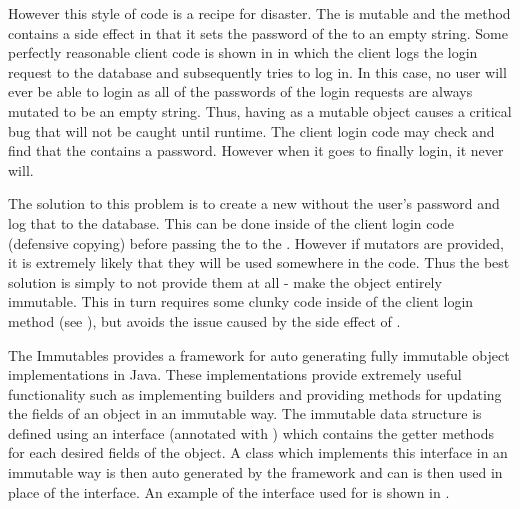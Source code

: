 



However this style of code is a recipe for disaster. The  is mutable and the  method contains a side effect in that it sets the password of the  to an empty string. Some perfectly reasonable client code is shown in  in which the client logs the login request to the database and subsequently tries to log in. In this case, no user will ever be able to login as all of the passwords of the login requests are always mutated to be an empty string. Thus, having  as a mutable object causes a critical bug that will not be caught until runtime. The client login code may check and find that the  contains a password. However when it goes to finally login, it never will.



The solution to this problem is to create a new  without the user's password and log that to the database. This can be done inside of the client login code (defensive copying) before passing the  to the . However if mutators are provided, it is extremely likely that they will be used somewhere in the code. Thus the best solution is simply to not provide them at all - make the object entirely immutable. This in turn requires some clunky code inside of the client login method (see ), but avoids the issue caused by the side effect of . 



The Immutables \cite{immutablesJava} provides a framework for auto generating fully immutable object implementations in Java. These implementations provide extremely useful functionality such as implementing builders and providing methods for updating the fields of an object in an immutable way. The immutable data structure is defined using an interface (annotated with ) which contains the getter methods for each desired fields of the object. A class which implements this interface in an immutable way is then auto generated by the framework and can is then used in place of the interface. An example of the interface used for  is shown in .

